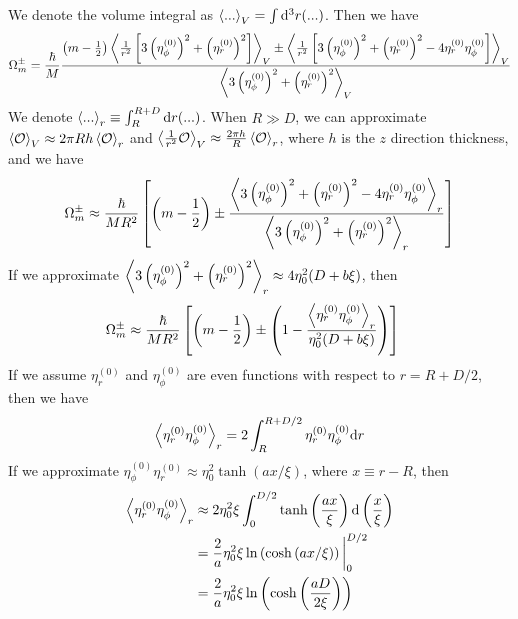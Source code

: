 \documentclass[aps,prl,preprint]{revtex4-2}
\begin{document}
We denote the volume integral as $\ev{...}_V = \int\dd[3]r(...)$.
Then we have
\begin{align}
    \Omega_m^\pm = \frac{\hbar}{M}
    \frac{\left(m-\frac{1}{2}\right)\ev{\frac{1}{r^2}\left[3\left(\eta^{(0)}_\phi\right)^2 + \left(\eta^{(0)}_r\right)^2\right]}_V
        \pm \ev{\frac{1}{r^2}\left[3\left(\eta^{(0)}_\phi\right)^2 + \left(\eta^{(0)}_r\right)^2-4\eta^{(0)}_r\eta^{(0)}_\phi\right]}_V}
    {\ev{3\left(\eta^{(0)}_\phi\right)^2 + \left(\eta^{(0)}_r\right)^2}_V}\nonumber
\end{align}
We denote $\ev{...}_r \equiv \int_R^{R+D}\dd r(...)$.
When $R\gg D$, we can approximate $\ev{\mathcal{O}}_V\approx 2\pi Rh\ev{\mathcal{O}}_r$
and $\ev{\frac{1}{r^2}\mathcal{O}}_V\approx \frac{2\pi h}{R}\ev{\mathcal{O}}_r$,
where $h$ is the $z$ direction thickness, and we have
\begin{align}\label{omega_m_approx}
    \Omega_m^\pm \approx \frac{\hbar}{MR^2}
    \left[\left(m-\frac{1}{2}\right)\pm
        \frac{\ev{3\left(\eta^{(0)}_\phi\right)^2 + \left(\eta^{(0)}_r\right)^2-4\eta^{(0)}_r\eta^{(0)}_\phi}_r}
        {\ev{3\left(\eta^{(0)}_\phi\right)^2 + \left(\eta^{(0)}_r\right)^2}_r}\right]
\end{align}
If we approximate
$\ev{3\left(\eta^{(0)}_\phi\right)^2 + \left(\eta^{(0)}_r\right)^2}_r\approx 4\eta_0^2(D + b\xi)$,
then
\begin{align}
    \Omega_m^\pm & \approx \frac{\hbar}{MR^2}
    \left[\left(m-\frac{1}{2}\right)\pm
        \left(1-\frac{\ev{\eta^{(0)}_r\eta^{(0)}_\phi}_r}{\eta_0^2(D+b\xi)}\right)\right]
\end{align}
If we assume $\eta^{(0)}_r$ and $\eta^{(0)}_\phi$ are even functions
with respect to $r=R+D/2$, then we have
\begin{align}
    \ev{\eta^{(0)}_r\eta^{(0)}_\phi}_r = 2\int_R^{R+D/2}\eta^{(0)}_r\eta^{(0)}_\phi\dd r
\end{align}
If we approximate $\eta_\phi^{(0)}\eta_r^{(0)}\approx \eta_0^2\tanh(ax/\xi)$,
where $x \equiv r-R$, then
\begin{align}
    \ev{\eta^{(0)}_r\eta^{(0)}_\phi}_r
     & \approx 2 \eta_0^2\xi
    \int_0^{D/2}
    \tanh\left(\frac{ax}{\xi}\right)
    \dd\left(\frac{x}{\xi}\right)                                                    \\
     & =\frac{2}{a}\eta_0^2\xi\ln\left(\cosh\left(ax/\xi\right)\right)\bigg|_0^{D/2} \\
     & =\frac{2}{a}\eta_0^2\xi\ln\left(\cosh\left(\frac{aD}{2\xi}\right)\right)
\end{align}
\end{document}
